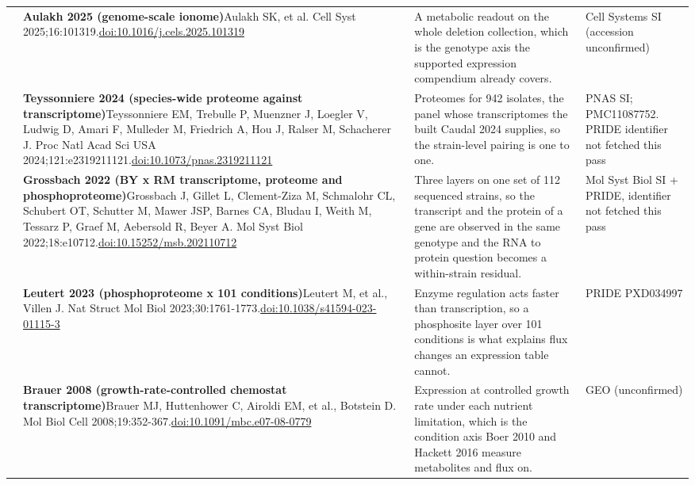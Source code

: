 \begin{landscape}
\begin{longtable}{@{}r@{\hspace{4pt}} L{86mm} L{92mm} L{62mm}@{}}
 & \textbf{Aulakh 2025 (genome-scale ionome)}\newline Aulakh SK, et al. Cell Syst 2025;16:101319.\newline \href{https://doi.org/10.1016/j.cels.2025.101319}{doi:10.1016/\allowbreak j.cels.2025.101319} & A metabolic readout on the whole deletion collection, which is the genotype axis the supported expression compendium already covers. & Cell Systems SI (accession unconfirmed) \\
 & \textbf{Teyssonniere 2024 (species-wide proteome against transcriptome)}\newline Teyssonniere EM, Trebulle P, Muenzner J, Loegler V, Ludwig D, Amari F, Mulleder M, Friedrich A, Hou J, Ralser M, Schacherer J. Proc Natl Acad Sci USA 2024;121:e2319211121.\newline \href{https://doi.org/10.1073/pnas.2319211121}{doi:10.1073/\allowbreak pnas.2319211121} & Proteomes for 942 isolates, the panel whose transcriptomes the built Caudal 2024 supplies, so the strain-level pairing is one to one. & PNAS SI; PMC11087752. PRIDE identifier not fetched this pass \\
 & \textbf{Grossbach 2022 (BY x RM transcriptome, proteome and phosphoproteome)}\newline Grossbach J, Gillet L, Clement-Ziza M, Schmalohr CL, Schubert OT, Schutter M, Mawer JSP, Barnes CA, Bludau I, Weith M, Tessarz P, Graef M, Aebersold R, Beyer A. Mol Syst Biol 2022;18:e10712.\newline \href{https://doi.org/10.15252/msb.202110712}{doi:10.15252/\allowbreak msb.202110712} & Three layers on one set of 112 sequenced strains, so the transcript and the protein of a gene are observed in the same genotype and the RNA to protein question becomes a within-strain residual. & Mol Syst Biol SI + PRIDE, identifier not fetched this pass \\
 & \textbf{Leutert 2023 (phosphoproteome x 101 conditions)}\newline Leutert M, et al., Villen J. Nat Struct Mol Biol 2023;30:1761-1773.\newline \href{https://doi.org/10.1038/s41594-023-01115-3}{doi:10.1038/\allowbreak s41594-023-01115-3} & Enzyme regulation acts faster than transcription, so a phosphosite layer over 101 conditions is what explains flux changes an expression table cannot. & PRIDE PXD034997 \\
 & \textbf{Brauer 2008 (growth-rate-controlled chemostat transcriptome)}\newline Brauer MJ, Huttenhower C, Airoldi EM, et al., Botstein D. Mol Biol Cell 2008;19:352-367.\newline \href{https://doi.org/10.1091/mbc.e07-08-0779}{doi:10.1091/\allowbreak mbc.e07-08-0779} & Expression at controlled growth rate under each nutrient limitation, which is the condition axis Boer 2010 and Hackett 2016 measure metabolites and flux on. & GEO (unconfirmed) \\

\end{longtable}
\end{landscape}
